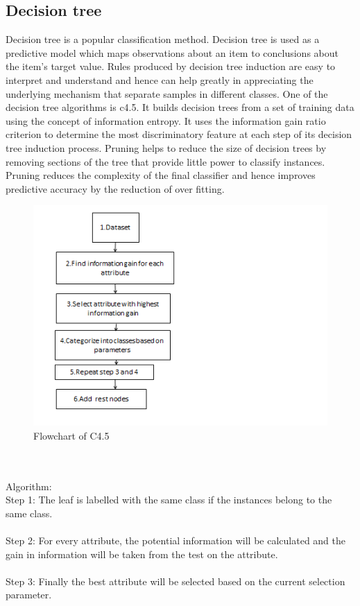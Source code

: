\documentclass[conference]{IEEEtran}
\begin{document}
\subsection{Decision tree}
Decision tree is a popular classification method. Decision tree is used as a predictive model which maps observations about an item to conclusions about the item's target value. Rules produced by decision tree induction are easy to interpret and understand and hence can help greatly in appreciating the underlying mechanism that separate samples in different classes. One of the decision tree algorithms is c4.5. It builds decision trees from a set of training data using the concept of information entropy. It uses the information gain ratio criterion to determine the most discriminatory feature at each step of its  decision tree induction process. Pruning helps to reduce the size of decision trees by removing sections of the tree that provide little power to classify instances. Pruning reduces the complexity of the final classifier and hence improves predictive accuracy by the reduction of over fitting.
\begin{figure}[!h]
\centering
\includegraphics[scale=0.7]{c45bw}
\caption{Flowchart of C4.5}
\label{fig_sin}
\end{figure}
\\ \\
Algorithm:
\\Step 1: The leaf is labelled with the same class if the instances belong to the same class. \\
\\Step 2: For every attribute, the potential information will be calculated and the gain in information will be taken from the test on the attribute. \\
\\Step 3: Finally the best attribute will be selected based on the current selection parameter. \\
\end{document}
